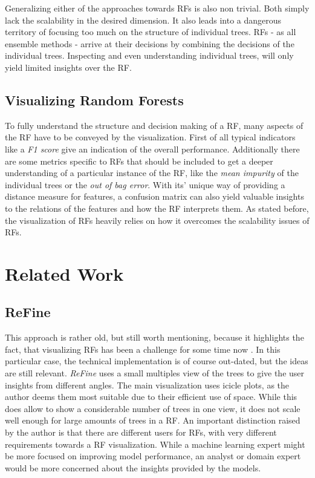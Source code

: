 \documentclass[a4paper, 12pt]{article}
\begin{document}
Generalizing either of the approaches towards RFs is also non trivial. Both simply lack the
scalability in the desired dimension. It also leads into a dangerous territory of focusing too much on
the structure of individual trees. RFs - as all ensemble methods - arrive at their decisions
by combining the decisions of the individual trees. Inspecting and even understanding
individual trees, will only yield limited insights over the RF.

\subsection{Visualizing Random Forests}
To fully understand the structure and decision making of a RF, many aspects of the RF have to
be conveyed by the visualization. First of all typical indicators like a \textit{F1 score}
give an indication of the overall performance. Additionally there are some metrics specific
to RFs that should be included to get a deeper understanding of a particular instance of the
RF, like the \textit{mean impurity} of the individual trees or the \textit{out of bag error}.
With its' unique way of providing a distance measure for features,
a confusion matrix can also yield valuable insights to the relations of the features and how
the RF interprets them. As stated before, the visualization of RFs heavily relies on how it
overcomes the scalability issues of RFs.

\section{Related Work}

\subsection{ReFine}
This approach is rather old, but still worth mentioning, because it highlights the fact,
that visualizing RFs has been a challenge for some time now \cite{kuznetsova2014random}.
In this particular case, the technical implementation is of course out-dated, but
the ideas are still relevant. \textit{ReFine} uses a small multiples view of the trees to give the user
insights from different angles. The main visualization uses icicle plots, as the author
deems them most suitable due to their efficient use of space. While this does allow to
show a considerable number of trees in one view, it does not scale well enough for large
amounts of trees in a RF.
An important distinction raised by the author is that there are different users for RFs,
with very different requirements towards a RF visualization. While a machine learning
expert might be more focused on improving model performance, an analyst or domain expert
would be more concerned about the insights provided by the models.
\end{document}
